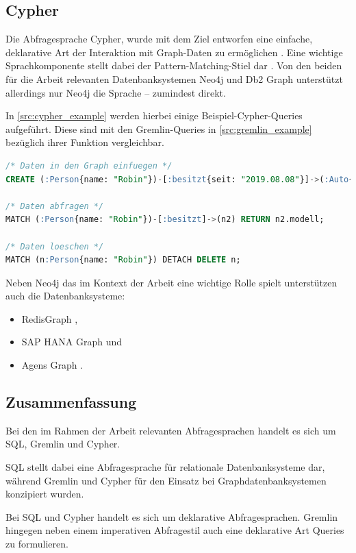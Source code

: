 \subsection{Cypher}
Die Abfragesprache Cypher, wurde mit dem Ziel entworfen eine einfache, deklarative Art der Interaktion mit Graph-Daten zu ermöglichen \cite{gdbms}. Eine wichtige Sprachkomponente stellt dabei der Pattern-Matching-Stiel dar \cite{gdbms}. Von den beiden für die Arbeit relevanten Datenbanksystemen Neo4j und Db2 Graph unterstützt allerdings nur Neo4j die Sprache -- zumindest direkt. 

In \autoref{src:cypher_example} werden hierbei einige Beispiel-Cypher-Queries aufgeführt. Diese sind mit den Gremlin-Queries in \autoref{src:gremlin_example} bezüglich ihrer Funktion vergleichbar. 

\begin{lstlisting}[caption={Beispiel Cypher-Queries},language=SQL,label=src:cypher_example]
/* Daten in den Graph einfuegen */
CREATE (:Person{name: "Robin"})-[:besitzt{seit: "2019.08.08"}]->(:Auto{modell: "Leaf"});

/* Daten abfragen */
MATCH (:Person{name: "Robin"})-[:besitzt]->(n2) RETURN n2.modell;

/* Daten loeschen */
MATCH (n:Person{name: "Robin"}) DETACH DELETE n;
\end{lstlisting}

Neben Neo4j das im Kontext der Arbeit eine wichtige Rolle spielt unterstützen auch die Datenbanksysteme:
\begin{itemize}
    \item RedisGraph \cite{redisgraph_2021},
    \item SAP HANA Graph \cite{opencypher_2021} und
    \item Agens Graph \cite{opencypher_2021}.
\end{itemize}

\subsection{Zusammenfassung}
Bei den im Rahmen der Arbeit relevanten Abfragesprachen handelt es sich um SQL, Gremlin und Cypher. 

SQL stellt dabei eine Abfragesprache für relationale Datenbanksysteme dar, während Gremlin und Cypher für den Einsatz bei Graphdatenbanksystemen konzipiert wurden. 

Bei SQL und Cypher handelt es sich um deklarative Abfragesprachen. Gremlin hingegen neben einem imperativen Abfragestil auch eine deklarative Art Queries zu formulieren. 